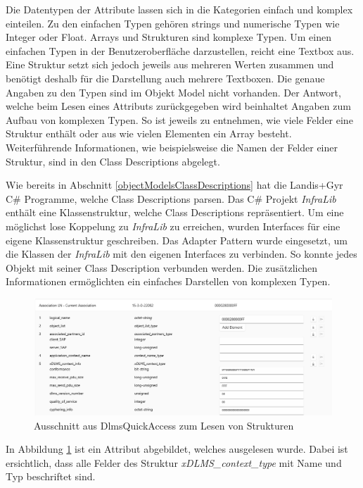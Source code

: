 Die Datentypen der Attribute lassen sich in die Kategorien einfach und komplex einteilen.
Zu den einfachen Typen gehören strings und numerische Typen wie Integer oder Float.
Arrays und Strukturen sind komplexe Typen.
Um einen einfachen Typen in der Benutzeroberfläche darzustellen, reicht eine Textbox aus.
Eine Struktur setzt sich jedoch jeweils aus mehreren Werten zusammen und benötigt deshalb für die Darstellung auch mehrere Textboxen.
Die genaue Angaben zu den Typen sind im Objekt Model nicht vorhanden.
Der Antwort, welche beim Lesen eines Attributs zurückgegeben wird beinhaltet Angaben zum Aufbau von komplexen Typen.
So ist jeweils zu entnehmen, wie viele Felder eine Struktur enthält oder aus wie vielen Elementen ein Array besteht.
Weiterführende Informationen, wie beispielsweise die Namen der Felder einer Struktur, sind in den Class Descriptions abgelegt.

Wie bereits in Abschnitt \ref{objectModelsClassDescriptions} hat die Landis+Gyr C\# Programme, welche Class Descriptions parsen.
Das C\# Projekt \textit{InfraLib} enthält eine Klassenstruktur, welche Class Descriptions repräsentiert.
Um eine möglichst lose Koppelung zu \textit{InfraLib} zu erreichen, wurden Interfaces für eine eigene Klassenstruktur geschreiben.
Das Adapter Pattern \parencite{designPatterns} wurde eingesetzt, um die Klassen der \textit{InfraLib} mit den eigenen Interfaces zu verbinden.
So konnte jedes Objekt mit seiner Class Description verbunden werden.
Die zusätzlichen Informationen ermöglichten ein einfaches Darstellen von komplexen Typen.
\begin{figure}
   \centering
   \includegraphics[width=1.0\textwidth]{gfx/AttributeReadExample.png}
   \caption{
      Ausschnitt aus DlmsQuickAccess zum Lesen von Strukturen
      }
      \label{fig:AttributeReadExample}
   \end{figure}
In Abbildung \ref{fig:AttributeReadExample} ist ein Attribut abgebildet, welches ausgelesen wurde.
Dabei ist ersichtlich, dass alle Felder des Struktur \textit{xDLMS\_context\_type} mit Name und Typ beschriftet sind.

